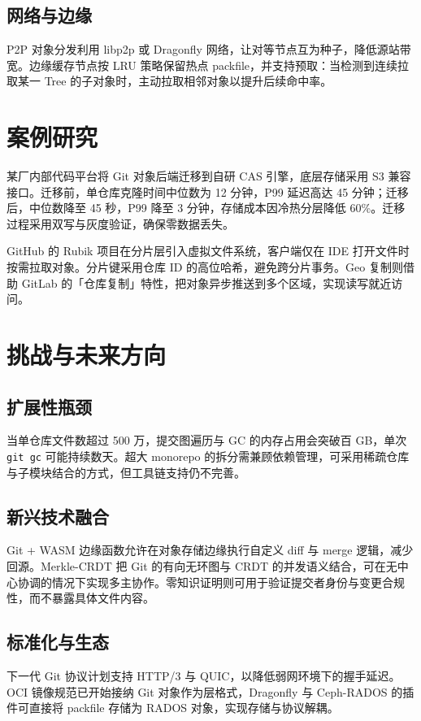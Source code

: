 \section{网络与边缘}
P2P 对象分发利用 libp2p 或 Dragonfly 网络，让对等节点互为种子，降低源站带宽。边缘缓存节点按 LRU 策略保留热点 packfile，并支持预取：当检测到连续拉取某一 Tree 的子对象时，主动拉取相邻对象以提升后续命中率。\par
\chapter{案例研究}
某厂内部代码平台将 Git 对象后端迁移到自研 CAS 引擎，底层存储采用 S3 兼容接口。迁移前，单仓库克隆时间中位数为 12 分钟，P99 延迟高达 45 分钟；迁移后，中位数降至 45 秒，P99 降至 3 分钟，存储成本因冷热分层降低 60\%{}。迁移过程采用双写与灰度验证，确保零数据丢失。\par
GitHub 的 Rubik 项目在分片层引入虚拟文件系统，客户端仅在 IDE 打开文件时按需拉取对象。分片键采用仓库 ID 的高位哈希，避免跨分片事务。Geo 复制则借助 GitLab 的「仓库复制」特性，把对象异步推送到多个区域，实现读写就近访问。\par
\chapter{挑战与未来方向}
\section{扩展性瓶颈}
当单仓库文件数超过 500 万，提交图遍历与 GC 的内存占用会突破百 GB，单次 \texttt{git gc} 可能持续数天。超大 monorepo 的拆分需兼顾依赖管理，可采用稀疏仓库与子模块结合的方式，但工具链支持仍不完善。\par
\section{新兴技术融合}
Git + WASM 边缘函数允许在对象存储边缘执行自定义 diff 与 merge 逻辑，减少回源。Merkle-CRDT 把 Git 的有向无环图与 CRDT 的并发语义结合，可在无中心协调的情况下实现多主协作。零知识证明则可用于验证提交者身份与变更合规性，而不暴露具体文件内容。\par
\section{标准化与生态}
下一代 Git 协议计划支持 HTTP/3 与 QUIC，以降低弱网环境下的握手延迟。OCI 镜像规范已开始接纳 Git 对象作为层格式，Dragonfly 与 Ceph-RADOS 的插件可直接将 packfile 存储为 RADOS 对象，实现存储与协议解耦。\par
